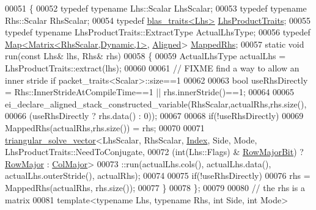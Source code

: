\begin{DoxyCode}
00051 \{
00052   \textcolor{keyword}{typedef} \textcolor{keyword}{typename} Lhs::Scalar LhsScalar;
00053   \textcolor{keyword}{typedef} \textcolor{keyword}{typename} Rhs::Scalar RhsScalar;
00054   \textcolor{keyword}{typedef} \hyperlink{struct_eigen_1_1internal_1_1blas__traits}{blas\_traits<Lhs>} \hyperlink{struct_eigen_1_1internal_1_1blas__traits}{LhsProductTraits};
00055   \textcolor{keyword}{typedef} \textcolor{keyword}{typename} LhsProductTraits::ExtractType ActualLhsType;
00056   \textcolor{keyword}{typedef} \hyperlink{group___core___module_class_eigen_1_1_map}{Map<Matrix<RhsScalar,Dynamic,1>}, 
      \hyperlink{group__enums_gga45fe06e29902b7a2773de05ba27b47a1ad37d4c71425bb286e9b4103830538fbf}{Aligned}> \hyperlink{group___core___module_class_eigen_1_1_map}{MappedRhs};
00057   \textcolor{keyword}{static} \textcolor{keywordtype}{void} run(\textcolor{keyword}{const} Lhs& lhs, Rhs& rhs)
00058   \{
00059     ActualLhsType actualLhs = LhsProductTraits::extract(lhs);
00060 
00061     \textcolor{comment}{// FIXME find a way to allow an inner stride if packet\_traits<Scalar>::size==1}
00062 
00063     \textcolor{keywordtype}{bool} useRhsDirectly = Rhs::InnerStrideAtCompileTime==1 || rhs.innerStride()==1;
00064 
00065     ei\_declare\_aligned\_stack\_constructed\_variable(RhsScalar,actualRhs,rhs.size(),
00066                                                   (useRhsDirectly ? rhs.data() : 0));
00067                                                   
00068     \textcolor{keywordflow}{if}(!useRhsDirectly)
00069       MappedRhs(actualRhs,rhs.size()) = rhs;
00070 
00071     \hyperlink{struct_eigen_1_1internal_1_1triangular__solve__vector}{triangular\_solve\_vector}<LhsScalar, RhsScalar, \hyperlink{namespace_eigen_a62e77e0933482dafde8fe197d9a2cfde}{Index}, Side, Mode, 
      LhsProductTraits::NeedToConjugate,
00072                             (int(Lhs::Flags) & \hyperlink{group__flags_gae4f56c2a60bbe4bd2e44c5b19cbe8762}{RowMajorBit}) ? 
      \hyperlink{group__enums_ggaacded1a18ae58b0f554751f6cdf9eb13acfcde9cd8677c5f7caf6bd603666aae3}{RowMajor} : \hyperlink{group__enums_ggaacded1a18ae58b0f554751f6cdf9eb13a0cbd4bdd0abcfc0224c5fcb5e4f6669a}{ColMajor}>
00073       ::run(actualLhs.cols(), actualLhs.data(), actualLhs.outerStride(), actualRhs);
00074 
00075     \textcolor{keywordflow}{if}(!useRhsDirectly)
00076       rhs = MappedRhs(actualRhs, rhs.size());
00077   \}
00078 \};
00079 
00080 \textcolor{comment}{// the rhs is a matrix}
00081 \textcolor{keyword}{template}<\textcolor{keyword}{typename} Lhs, \textcolor{keyword}{typename} Rhs, \textcolor{keywordtype}{int} S\textcolor{keywordtype}{id}e, \textcolor{keywordtype}{int} Mode>

\end{DoxyCode}
